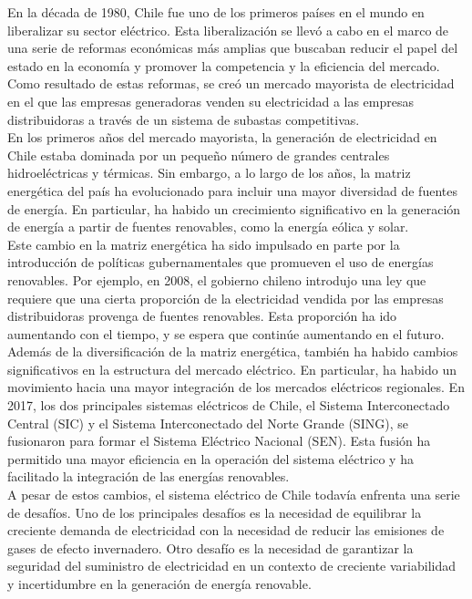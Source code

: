 En la década de 1980, Chile fue uno de los primeros países en el mundo en liberalizar su sector eléctrico. Esta liberalización se llevó a cabo en el marco de una serie de reformas económicas más amplias que buscaban reducir el papel del estado en la economía y promover la competencia y la eficiencia del mercado. Como resultado de estas reformas, se creó un mercado mayorista de electricidad en el que las empresas generadoras venden su electricidad a las empresas distribuidoras a través de un sistema de subastas competitivas.\\

En los primeros años del mercado mayorista, la generación de electricidad en Chile estaba dominada por un pequeño número de grandes centrales hidroeléctricas y térmicas. Sin embargo, a lo largo de los años, la matriz energética del país ha evolucionado para incluir una mayor diversidad de fuentes de energía. En particular, ha habido un crecimiento significativo en la generación de energía a partir de fuentes renovables, como la energía eólica y solar.\\

Este cambio en la matriz energética ha sido impulsado en parte por la introducción de políticas gubernamentales que promueven el uso de energías renovables. Por ejemplo, en 2008, el gobierno chileno introdujo una ley que requiere que una cierta proporción de la electricidad vendida por las empresas distribuidoras provenga de fuentes renovables. Esta proporción ha ido aumentando con el tiempo, y se espera que continúe aumentando en el futuro.\\

Además de la diversificación de la matriz energética, también ha habido cambios significativos en la estructura del mercado eléctrico. En particular, ha habido un movimiento hacia una mayor integración de los mercados eléctricos regionales. En 2017, los dos principales sistemas eléctricos de Chile, el Sistema Interconectado Central (SIC) y el Sistema Interconectado del Norte Grande (SING), se fusionaron para formar el Sistema Eléctrico Nacional (SEN). Esta fusión ha permitido una mayor eficiencia en la operación del sistema eléctrico y ha facilitado la integración de las energías renovables.\\

A pesar de estos cambios, el sistema eléctrico de Chile todavía enfrenta una serie de desafíos. Uno de los principales desafíos es la necesidad de equilibrar la creciente demanda de electricidad con la necesidad de reducir las emisiones de gases de efecto invernadero. Otro desafío es la necesidad de garantizar la seguridad del suministro de electricidad en un contexto de creciente variabilidad y incertidumbre en la generación de energía renovable.\\


